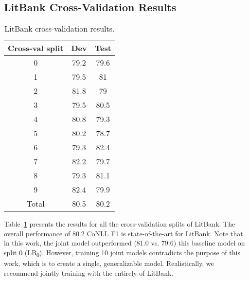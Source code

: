 \documentclass[12pt]{thesis-umich}[thesis]
\begin{document}
\subsection{LitBank Cross-Validation Results}
\label{sec:appendix:other:lb}
\begin{table}[h]
    \centering
    \small
    \begin{tabular}{ccc}\toprule
Cross-val split & Dev & Test \\
\midrule
0                    & 79.2 & 79.6 \\
1                    & 79.5 & 81   \\
2                    & 81.8 & 79   \\
3                    & 79.5 & 80.5 \\
4                    & 80.8 & 79.3 \\
5                    & 80.2 & 78.7 \\
6                    & 79.3 & 82.4 \\
7                    & 82.2 & 79.7 \\
8                    & 79.3 & 81.1 \\
9                    & 82.4 & 79.9 \\
\midrule
Total & 80.5 & 80.2 \\
\bottomrule
\end{tabular}
\caption{LitBank cross-validation results.}
\label{table:litbank_all}
\end{table}
 
Table~\ref{table:litbank_all} presents the results for all the cross-validation splits of LitBank. The overall performance of 80.2 CoNLL F1 is state-of-the-art for LitBank. Note that in this work, the joint model outperformed (81.0 vs. 79.6) this baseline model on split 0 (LB\textsubscript{0}). However, training 10 joint models contradicts the purpose of this work, which is to create a single, generalizable model. Realistically, we recommend jointly training with the entirely of LitBank.
\end{document}

